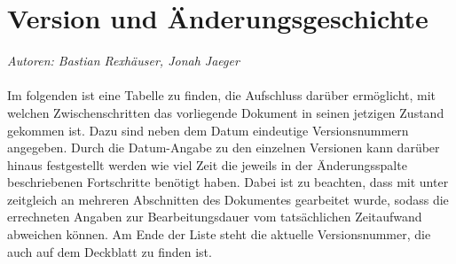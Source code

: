 \documentclass[enabledeprecatedfontcommands,fontsize=11pt,paper=a4,twoside]{scrartcl}
\newcounter{one}
\renewcommand{\headrulewidth}{0pt}
\begin{document}
  \thispagestyle{fancy}
  \fancyhead{}
  \fancyfoot{}
  \renewcommand{\headrulewidth}{0.4pt}
  \tableofcontents

\newpage



\thispagestyle{empty}
\cleardoublepage

\section*{Version und Änderungsgeschichte}
\emph{Autoren: Bastian Rexhäuser, Jonah Jaeger}\\ \\
Im folgenden ist eine Tabelle zu finden, die Aufschluss darüber ermöglicht, mit welchen Zwischenschritten das vorliegende Dokument in seinen jetzigen Zustand gekommen ist. Dazu sind neben dem Datum eindeutige Versionsnummern angegeben. Durch die Datum-Angabe zu den einzelnen Versionen kann darüber hinaus festgestellt werden wie viel Zeit die jeweils in der Änderungsspalte beschriebenen Fortschritte benötigt haben. Dabei ist zu beachten, dass mit unter zeitgleich an mehreren Abschnitten des Dokumentes gearbeitet wurde, sodass die errechneten Angaben zur Bearbeitungsdauer vom tatsächlichen Zeitaufwand abweichen können. Am Ende der Liste steht die aktuelle Versionsnummer, die auch auf dem Deckblatt zu finden ist.  \\
\end{document}

